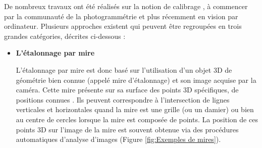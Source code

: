   De nombreux travaux ont été réalisés sur la notion de calibrage , à commencer par la communauté de la photogrammétrie et plus récemment en vision par ordinateur.
  Plusieurs approches existent qui peuvent être regroupées en trois grandes catégories, décrites ci-dessous : 
  
  \begin{itemize}[label={\Huge$\star$}]
  	 
  \item \textbf{L’étalonnage par mire}
  
  L’étalonnage par mire est donc basé sur l’utilisation d’un objet 3D de géométrie bien connue (appelé mire d’étalonnage) et son image acquise par la caméra. Cette mire présente sur sa surface des points 3D spécifiques, de positions connues . Ils peuvent correspondre à l’intersection de lignes verticales et horizontales quand la mire est une grille (ou un damier) ou bien au centre de cercles lorsque la mire est composée de points. La position de ces points 3D sur l’image de la mire est souvent obtenue via des procédures automatiques d’analyse d’images\cite{faugeras_three-dimensional_1993,eikosim_etalonnage_2021}  (Figure \ref{fig:Exemples de mires}).
  

\end{itemize}
